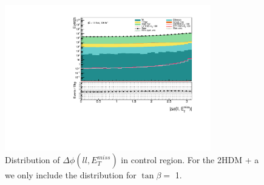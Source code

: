 \documentclass[12pt, a4paper]{book}
\begin{document}
\begin{figure}[!ht]
    \centering
        \includegraphics[width=0.8\textwidth]{dPhiLLMET.pdf}
    \caption{Distribution of $\Delta\phi(ll,E_T^{miss})$ in control region.  For the 2HDM + a we only include the distribution for $\tan\beta=$ 1.}\label{fig:dPhiLLMET_dist}
\end{figure}
\end{document}
